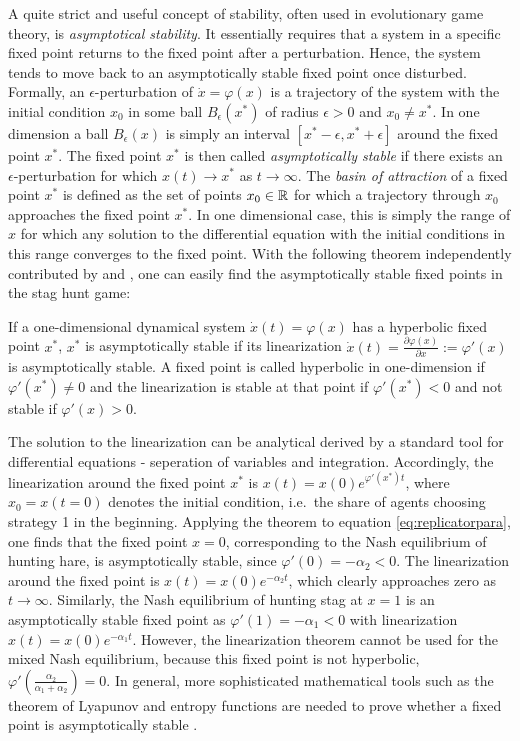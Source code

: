 A quite strict and useful concept of stability, often used in evolutionary 
game theory, is \textit{asymptotical stability}. 
It essentially requires that a system in a specific fixed point returns 
to the fixed point after a perturbation.
Hence, the system tends to move back to an asymptotically stable fixed point
once disturbed. Formally, an $\epsilon$-perturbation of 
$\dot{x} = \varphi(x)$ is a trajectory of the system with the initial
condition $x_0$ in some ball $B_\epsilon(x^*)$ of radius $\epsilon >0$ and 
$x_0 \neq x^*$. 
In one dimension a ball $B_{\epsilon}(x)$ is simply an interval 
$[x^*-\epsilon, x^*+\epsilon]$ around the fixed point $x^*$.
The fixed point $x^*$ is then called \textit{asymptotically
stable} if there exists an $\epsilon$-perturbation for which $x(t) \rightarrow
x^*$ as $t \rightarrow \infty$. 
The \textit{basin of attraction} of a fixed point $x^*$ is defined as the set 
of points $x_0 \in \mathbb{R}$ for which a trajectory through $x_0$ approaches 
the fixed point $x^*$. In one dimensional case, this is simply the range 
of $x$ for which any solution to the differential equation with the initial 
conditions in this range converges to the fixed point. With the following 
theorem independently contributed by \textcite{hartman_lemma_1960} and 
\textcite{grobman_homeomorphism_1959}, one can easily 
find the asymptotically stable fixed points in the stag hunt game:
\begin{mydef}
        If a one-dimensional dynamical system $\dot{x}(t) = \varphi(x)$ 
        has a hyperbolic fixed point $x^*$, $x^*$ is asymptotically stable
        if its linearization 
        $\dot{x}(t) = \frac{\partial\varphi(x)}{\partial x} := \varphi'(x)$ 
        is asymptotically stable. 
        A fixed point is called hyperbolic in one-dimension if 
        $\varphi'(x^*) \neq 0$ and the linearization is stable at that
        point if $\varphi'(x^*) < 0$ and not stable if $\varphi'(x) >0$.
\end{mydef}
The solution to the linearization can be analytical derived by 
a standard tool for differential equations - seperation of variables and 
integration.
Accordingly, the linearization around the fixed point $x^*$ is 
$x(t)= x(0) e^{\varphi'(x^*)t}$, where $x_0=x(t=0)$ denotes the 
initial condition, i.e.\ the share of agents choosing strategy 1 in the 
beginning.
Applying the theorem to equation \eqref{eq:replicatorpara}, 
one finds that the 
fixed point $x=0$, corresponding to the Nash equilibrium of hunting hare, is 
asymptotically stable, since $\varphi'(0) = - \alpha_2 <0$. 
The linearization around the fixed point is $x(t) = x(0) e^{-\alpha_2 t}$, 
which clearly approaches zero as $t \rightarrow \infty$. 
Similarly, the Nash equilibrium 
of hunting stag at $x=1$ is an asymptotically stable fixed point as
$\varphi'(1) = -\alpha_1 <0$ with linearization $x(t) = x(0) e^{-\alpha_1 t}$.
However, the linearization theorem cannot be used for the mixed Nash 
equilibrium, because this fixed point is not hyperbolic, 
$\varphi'(\frac{\alpha_2}{\alpha_1+\alpha_2}) = 0$.
In general, more sophisticated mathematical tools such as the theorem of 
Lyapunov and entropy functions are needed to prove whether a fixed point
is asymptotically stable \parencite{friedman_economic_1998}.

